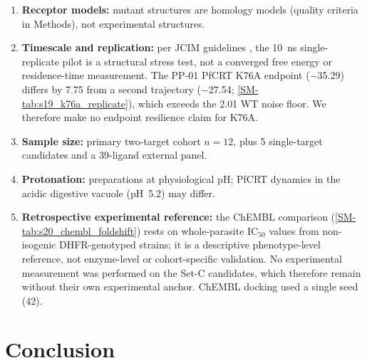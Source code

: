 \documentclass[11pt,a4paper]{article}
\begin{document}
\begin{enumerate}
    \item \textbf{Receptor models:} mutant structures are homology models (quality criteria in Methods), not experimental structures.
    \item \textbf{Timescale and replication:} per JCIM guidelines \citep{soares2023mdreport}, the \qty{10}{\ns} single-replicate pilot is a structural stress test, not a converged free energy or residence-time measurement. The PP-01 PfCRT K76A endpoint (\qty{-35.29}{\kcalmol}) differs by \qty{7.75}{\kcalmol} from a second trajectory (\qty{-27.54}{\kcalmol}; \cref{SM-tab:s19_k76a_replicate}), which exceeds the \qty{2.01}{\kcalmol} WT noise floor. We therefore make no endpoint resilience claim for K76A.
    \item \textbf{Sample size:} primary two-target cohort $n=\num{12}$, plus 5 single-target candidates and a 39-ligand external panel.
    \item \textbf{Protonation:} preparations at physiological pH; PfCRT dynamics in the acidic digestive vacuole (pH~\num{5.2}) may differ.
    \item \textbf{Retrospective experimental reference:} the ChEMBL comparison (\cref{SM-tab:s20_chembl_foldshift}) rests on whole-parasite IC$_{50}$ values from non-isogenic DHFR-genotyped strains; it is a descriptive phenotype-level reference, not enzyme-level or cohort-specific validation. No experimental measurement was performed on the Set-C candidates, which therefore remain without their own experimental anchor. ChEMBL docking used a single seed (\num{42}).
\end{enumerate}


\section{Conclusion}
\end{document}
